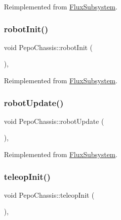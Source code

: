 Reimplemented from \hyperlink{classFluxSubsystem_a5c39cb0f0834cc77a2b8f4f47778da87}{Flux\+Subsystem}.

\mbox{\label{classPepoChassis_a18dd25fff35cf7ccac6b710e329873e6}} 
\subsubsection{\texorpdfstring{robot\+Init()}{robotInit()}}
{\footnotesize\ttfamily void Pepo\+Chassis\+::robot\+Init (\begin{DoxyParamCaption}{ }\end{DoxyParamCaption})\hspace{0.3cm}{\ttfamily [override]}, {\ttfamily [virtual]}}



Reimplemented from \hyperlink{classFluxSubsystem_aacd5ddfcadda0866d5e838de09a60d63}{Flux\+Subsystem}.

\mbox{\label{classPepoChassis_acd6fa29da41ac5108af7e3a1f15218aa}} 
\subsubsection{\texorpdfstring{robot\+Update()}{robotUpdate()}}
{\footnotesize\ttfamily void Pepo\+Chassis\+::robot\+Update (\begin{DoxyParamCaption}{ }\end{DoxyParamCaption})\hspace{0.3cm}{\ttfamily [override]}, {\ttfamily [virtual]}}



Reimplemented from \hyperlink{classFluxSubsystem_ac2b1c08b53251870e945edf7080c1549}{Flux\+Subsystem}.

\mbox{\label{classPepoChassis_a44dbc37a56fe98d7b57af840e8da73b2}} 
\subsubsection{\texorpdfstring{teleop\+Init()}{teleopInit()}}
{\footnotesize\ttfamily void Pepo\+Chassis\+::teleop\+Init (\begin{DoxyParamCaption}{ }\end{DoxyParamCaption})\hspace{0.3cm}{\ttfamily [override]}, {\ttfamily [virtual]}}



